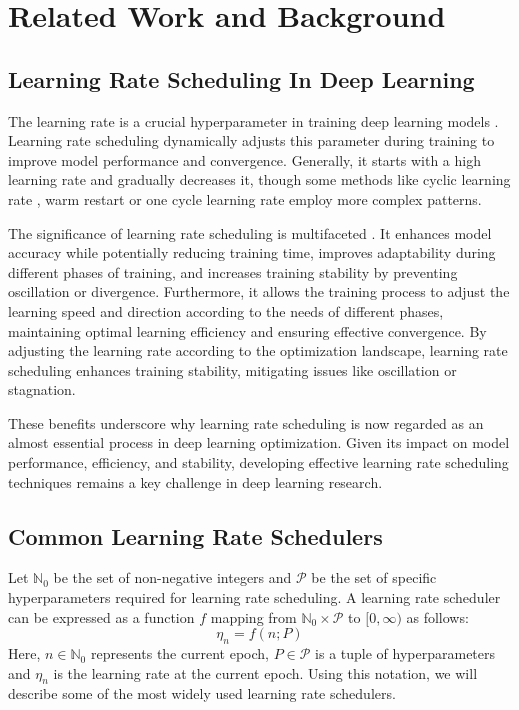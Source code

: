 \documentclass{article}
\theoremstyle{plain}
\theoremstyle{definition}
\theoremstyle{remark}
\begin{document}
\section{Related Work and Background}
\label{sec:related}

\subsection{Learning Rate Scheduling In Deep Learning}
\label{subsec:lr_scheduling}

The learning rate is a crucial hyperparameter in training deep learning models \cite{bengio2012practical,breuel2015effects,goodfellow2016deep}.
Learning rate scheduling dynamically adjusts this parameter during training to improve model performance and convergence.
Generally, it starts with a high learning rate and gradually decreases it, though some methods like cyclic learning rate \cite{smith2017cyclical}, warm restart \cite{loshchilov2016sgdr} or one cycle learning rate \cite{smith2019super} employ more complex patterns.

The significance of learning rate scheduling is multifaceted \cite{wu2023selecting}.
It enhances model accuracy while potentially reducing training time, improves adaptability during different phases of training, and increases training stability by preventing oscillation or divergence.
Furthermore, it allows the training process to adjust the learning speed and direction according to the needs of different phases, maintaining optimal learning efficiency and ensuring effective convergence.
By adjusting the learning rate according to the optimization landscape, learning rate scheduling enhances training stability, mitigating issues like oscillation or stagnation.

These benefits underscore why learning rate scheduling is now regarded as an almost essential process in deep learning optimization.
Given its impact on model performance, efficiency, and stability, developing effective learning rate scheduling techniques remains a key challenge in deep learning research.

\subsection{Common Learning Rate Schedulers}

Let $\mathbb{N}_0$ be the set of non-negative integers and $\mathcal{P}$ be the set of specific hyperparameters required for learning rate scheduling.
A learning rate scheduler can be expressed as a function $f$ mapping from $\mathbb{N}_0 \times \mathcal{P}$ to $[0, \infty)$ as follows:
\begin{equation}
\eta_n = f(n; P)
\end{equation}
Here, $n \in \mathbb{N}_0$ represents the current epoch, $P \in \mathcal{P}$ is a tuple of hyperparameters and $\eta_n$ is the learning rate at the current epoch.
Using this notation, we will describe some of the most widely used learning rate schedulers.
\end{document}
